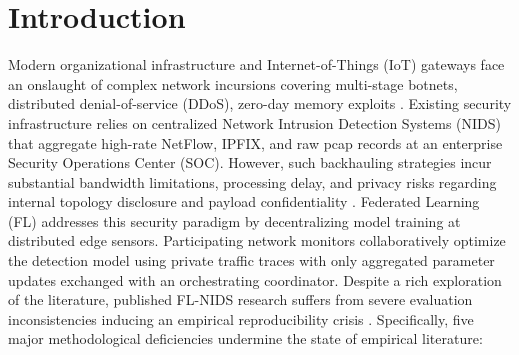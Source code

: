 \documentclass[conference]{IEEEtran}
\begin{document}
\section{Introduction}
Modern organizational infrastructure and Internet-of-Things (IoT) gateways face an onslaught of complex network incursions covering multi-stage botnets, distributed denial-of-service (DDoS), zero-day memory exploits \cite{alsaedi2020ton, garcia2020iot23}. Existing security infrastructure relies on centralized Network Intrusion Detection Systems (NIDS) that aggregate high-rate NetFlow, IPFIX, and raw pcap records at an enterprise Security Operations Center (SOC). However, such backhauling strategies incur substantial bandwidth limitations, processing delay, and privacy risks regarding internal topology disclosure and payload confidentiality \cite{campos2022evaluating, mothukuri2021federated}. Federated Learning (FL) \cite{mcmahan2017communication, kairouz2021advances} addresses this security paradigm by decentralizing model training at distributed edge sensors. Participating network monitors collaboratively optimize the detection model using private traffic traces with only aggregated parameter updates exchanged with an orchestrating coordinator. Despite a rich exploration of the literature, published FL-NIDS research suffers from severe evaluation inconsistencies inducing an empirical reproducibility crisis \cite{campos2022evaluating, popoola2021federated}. Specifically, five major methodological deficiencies undermine the state of empirical literature:
\end{document}
